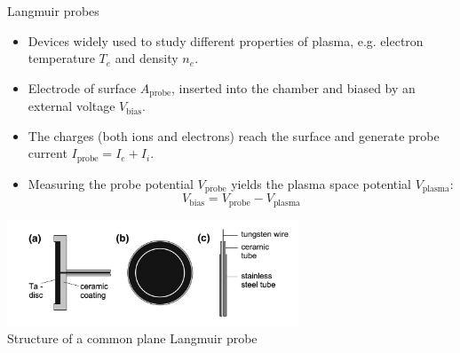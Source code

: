 \documentclass[10pt]{beamer}
\newcommand{\probecurrent}[0]{\ensuremath{I_{\mathrm{probe}}}}
\newcommand{\biasvoltage}{\ensuremath{V_{\mathrm{bias}}}}
\newcommand{\probevoltage}{\ensuremath{V_{\mathrm{probe}}}}
\newcommand{\plasmavoltage}{\ensuremath{V_{\mathrm{plasma}}}}
\begin{document}
\begin{frame}{Langmuir probes}
    \vspace{0.2cm}
    \begin{itemize}
        \item Devices widely used to study different properties of plasma, e.g. electron temperature $T_e$ and density $n_e$.
        
        \item Electrode of surface $A_{\mathrm{probe}}$, inserted into the chamber and biased by an external voltage $\biasvoltage$.
        \item The charges (both ions and electrons) reach the surface and generate probe current $\probecurrent = I_e + I_i$.
        \item Measuring the probe potential $\probevoltage$ yields the plasma space potential $\plasmavoltage$:
        \begin{equation*}
            \biasvoltage= \probevoltage - \plasmavoltage
        \end{equation*}
    \end{itemize}

    \begin{center}
        \includegraphics[width=0.65\textwidth]{../figures/langmuir_probe.png}
        \\
        \small Structure of a common plane Langmuir probe 
    \end{center}
\end{frame}
\end{document}
